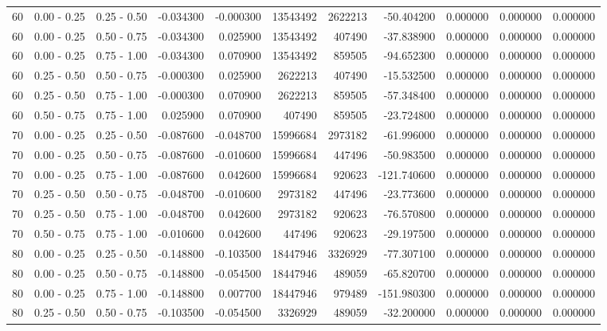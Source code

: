 \begin{table}
\begin{tabular}{rllrrrrrrrr}
60 & 0.00 - 0.25 & 0.25 - 0.50 & -0.034300 & -0.000300 & 13543492 & 2622213 & -50.404200 & 0.000000 & 0.000000 & 0.000000 \\
60 & 0.00 - 0.25 & 0.50 - 0.75 & -0.034300 & 0.025900 & 13543492 & 407490 & -37.838900 & 0.000000 & 0.000000 & 0.000000 \\
60 & 0.00 - 0.25 & 0.75 - 1.00 & -0.034300 & 0.070900 & 13543492 & 859505 & -94.652300 & 0.000000 & 0.000000 & 0.000000 \\
60 & 0.25 - 0.50 & 0.50 - 0.75 & -0.000300 & 0.025900 & 2622213 & 407490 & -15.532500 & 0.000000 & 0.000000 & 0.000000 \\
60 & 0.25 - 0.50 & 0.75 - 1.00 & -0.000300 & 0.070900 & 2622213 & 859505 & -57.348400 & 0.000000 & 0.000000 & 0.000000 \\
60 & 0.50 - 0.75 & 0.75 - 1.00 & 0.025900 & 0.070900 & 407490 & 859505 & -23.724800 & 0.000000 & 0.000000 & 0.000000 \\
70 & 0.00 - 0.25 & 0.25 - 0.50 & -0.087600 & -0.048700 & 15996684 & 2973182 & -61.996000 & 0.000000 & 0.000000 & 0.000000 \\
70 & 0.00 - 0.25 & 0.50 - 0.75 & -0.087600 & -0.010600 & 15996684 & 447496 & -50.983500 & 0.000000 & 0.000000 & 0.000000 \\
70 & 0.00 - 0.25 & 0.75 - 1.00 & -0.087600 & 0.042600 & 15996684 & 920623 & -121.740600 & 0.000000 & 0.000000 & 0.000000 \\
70 & 0.25 - 0.50 & 0.50 - 0.75 & -0.048700 & -0.010600 & 2973182 & 447496 & -23.773600 & 0.000000 & 0.000000 & 0.000000 \\
70 & 0.25 - 0.50 & 0.75 - 1.00 & -0.048700 & 0.042600 & 2973182 & 920623 & -76.570800 & 0.000000 & 0.000000 & 0.000000 \\
70 & 0.50 - 0.75 & 0.75 - 1.00 & -0.010600 & 0.042600 & 447496 & 920623 & -29.197500 & 0.000000 & 0.000000 & 0.000000 \\
80 & 0.00 - 0.25 & 0.25 - 0.50 & -0.148800 & -0.103500 & 18447946 & 3326929 & -77.307100 & 0.000000 & 0.000000 & 0.000000 \\
80 & 0.00 - 0.25 & 0.50 - 0.75 & -0.148800 & -0.054500 & 18447946 & 489059 & -65.820700 & 0.000000 & 0.000000 & 0.000000 \\
80 & 0.00 - 0.25 & 0.75 - 1.00 & -0.148800 & 0.007700 & 18447946 & 979489 & -151.980300 & 0.000000 & 0.000000 & 0.000000 \\
80 & 0.25 - 0.50 & 0.50 - 0.75 & -0.103500 & -0.054500 & 3326929 & 489059 & -32.200000 & 0.000000 & 0.000000 & 0.000000 \\

\end{tabular}
\end{table}
